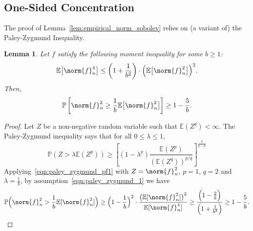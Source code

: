 \documentclass{article}
\newcommand{\1}{\mathbf{1}}
\newcommand{\Ebb}{\mathbb{E}}
\theoremstyle{alden}
\theoremstyle{aldenthm}
\newtheorem{lemma}{Lemma}
\theoremstyle{definition}
\theoremstyle{remark}
\begin{document}
\subsection{One-Sided Concentration}
	
The proof of Lemma~\ref{lem:empirical_norm_sobolev} relies on (a variant of) the Paley-Zygmund Inequality.
\begin{lemma}
	\label{lem:paley_zygmund}
	Let $f$ satisfy the following moment inequality for some $b \geq 1$:
	\begin{equation}
	\label{eqn:paley_zygmund_1}
	\Ebb\bigl[\norm{f}_n^4\bigr] \leq \left(1 + \frac{1}{b^2}\right)\cdot\Bigl(\Ebb\bigl[\norm{f}_n^2\bigr]\Bigr)^2.
	\end{equation}
	Then,
	\begin{equation}
	\label{eqn:paley_zygmund_2}
	\mathbb{P}\left[\norm{f}_n^2 \geq \frac{1}{b} \Ebb\bigl[\norm{f}_n^2\bigr]\right] \geq 1 - \frac{5}{b}.
	\end{equation}
\end{lemma}
\begin{proof}
	Let $Z$ be a non-negative random variable such that $\mathbb{E}(Z^q) < \infty$. The Paley-Zygmund inequality says that for all $0 \leq \lambda \leq 1$,
	\begin{equation}
	\label{eqn:paley_zygmund_pf1}
	\mathbb{P}(Z > \lambda \mathbb{E}(Z^p)) \geq \left[(1 - \lambda^p) \frac{\mathbb{E}(Z^p)}{(\mathbb{E}(Z^q))^{p/q}}\right]^{\frac{q}{q - p}}
	\end{equation}
	Applying~\eqref{eqn:paley_zygmund_pf1} with $Z = \norm{f}_n^2$, $p = 1$, $q = 2$ and $\lambda = \frac{1}{b}$, by assumption~\eqref{eqn:paley_zygmund_1} we have
	\begin{equation*}
	\mathbb{P}\Bigl(\norm{f}_n^2 > \frac{1}{b} \mathbb{E}[\norm{f}_n^2]\Bigr) \geq \Bigl(1 - \frac{1}{b}\Bigr)^2 \cdot  \frac{\bigl(\mathbb{E}[\norm{f}_n^2]\bigr)^2}{\mathbb{E}[\norm{f}_n^4]} \geq \frac{\Bigl(1 - \frac{2}{b}\Bigr)}{\Bigl(1 + \frac{1}{b^2}\Bigr)} \geq 1 - \frac{5}{b}.
	\end{equation*}
\end{proof}
\end{document}
